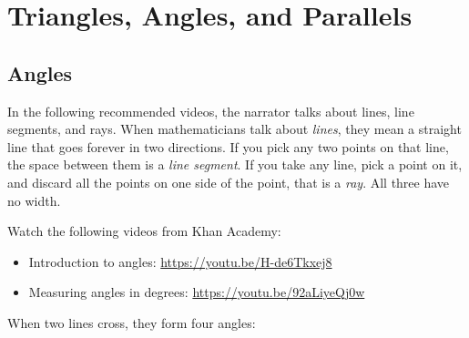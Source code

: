 \chapter{Triangles, Angles, and Parallels}


\section{Angles}
In the following recommended videos, the narrator talks about
lines, line segments, and rays. When mathematicians talk about
\emph{lines}, they mean a straight line that goes forever in two 
directions. If you pick any two points on that line, the space between 
them is a \emph{line segment}. If you take any line, pick 
a point on it, and discard all the points on one side of the point, that 
is a \emph{ray}. All three have no width.

\begin{center}
\hspace{10mm}
\hspace{6mm}
\end{center}



Watch the following videos from Khan Academy:
\begin{itemize}
\item Introduction to angles: \url{https://youtu.be/H-de6Tkxej8}
\item Measuring angles in degrees: \url{https://youtu.be/92aLiyeQj0w} 
\end{itemize}

When two lines cross, they form four angles:

